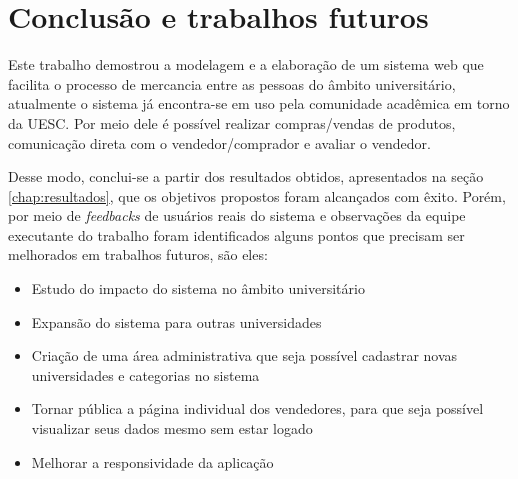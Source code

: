 \chapter{Conclusão e trabalhos futuros}
\label{chap:conclusoes_trabalhos_futuros}

Este trabalho demostrou a modelagem e a elaboração de um sistema web que facilita o processo de mercancia entre as pessoas do âmbito universitário, atualmente o sistema já encontra-se em uso pela comunidade acadêmica em torno da UESC. Por meio dele é possível realizar compras/vendas de produtos, comunicação direta com o vendedor/comprador e avaliar o vendedor.

Desse modo, conclui-se a partir dos resultados obtidos, apresentados na seção \ref{chap:resultados}, que os objetivos propostos foram alcançados com êxito. Porém, por meio de \textit{feedbacks} de usuários reais do sistema e observações da equipe executante do trabalho foram identificados alguns pontos que precisam ser melhorados em trabalhos futuros, são eles:
\begin{itemize}
    \item Estudo do impacto do sistema no âmbito universitário
    \item Expansão do sistema para outras universidades
    \item Criação de uma área administrativa que seja possível cadastrar novas universidades e categorias no sistema
    \item Tornar pública a página individual dos vendedores, para que seja possível visualizar seus dados mesmo sem estar logado
    \item Melhorar a responsividade da aplicação
 \end{itemize}


